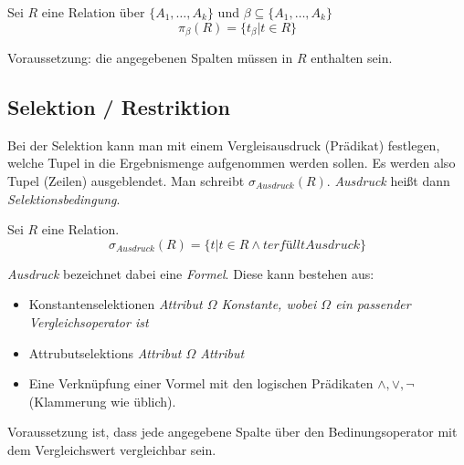 \documentclass{scrbook}
\begin{document}
\begin{definition}[Projektion]
Sei $R$ eine Relation über $\{A_1, \dots, A_k\}$ und $β ⊆ \{ A_1, \dots, A_k \}$
\begin{displaymath}
π_β(R) = \{ t_β | t ∈ R \}
\end{displaymath}
\end{definition}

Voraussetzung: die angegebenen Spalten müssen in $R$ enthalten sein.



% 
%
%


\subsection{Selektion / Restriktion}
Bei der Selektion kann man mit einem Vergleisausdruck (Prädikat) festlegen,
welche Tupel in die Ergebnismenge aufgenommen werden sollen.
Es werden also Tupel (Zeilen) ausgeblendet.
Man schreibt $σ_{Ausdruck}(R)$.
\emph{Ausdruck} heißt dann \emph{Selektionsbedingung}.

\begin{definition}[Selektion]
Sei $R$ eine Relation.
\begin{displaymath}
σ_{Ausdruck}(R) = \{ t | t ∈ R ∧ t erfüllt Ausdruck \} 
\end{displaymath}

\emph{Ausdruck} bezeichnet dabei eine \emph{Formel}. Diese kann bestehen aus:
\begin{itemize}
\item Konstantenselektionen \emph{Attribut $Ω$ Konstante, wobei $Ω$ ein passender Vergleichsoperator ist}
\item Attrubutselektions \emph{Attribut $Ω$ Attribut}
\item Eine Verknüpfung einer Vormel mit den logischen Prädikaten $∧,∨,¬$ (Klammerung wie üblich).
\end{itemize}
\end{definition}

Voraussetzung ist, dass jede angegebene Spalte über den Bedinungsoperator 
mit dem Vergleichswert vergleichbar sein.
\end{document}
